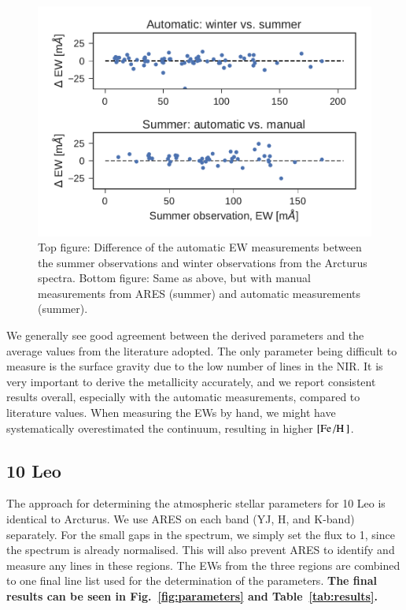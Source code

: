 \documentclass{aa}
\begin{document}
\begin{figure}[htpb!]
    \centering
    \includegraphics[width=1.0\linewidth]{figures/EWcomp.pdf}
    \caption{Top figure: Difference of the automatic EW measurements between the
             summer observations and winter observations from the Arcturus
             spectra. Bottom figure: Same as above, but with manual measurements
             from ARES (summer) and automatic measurements (summer).}
    \label{fig:EWcomp}
\end{figure}


We generally see good agreement between the derived parameters and the average
values from the literature adopted. The only parameter being difficult to
measure is the surface gravity due to the low number of  lines in
the NIR. It is very important to derive the metallicity accurately, and we
report consistent results overall, especially with the automatic measurements,
compared to literature values. When measuring the EWs by hand, we might have
systematically overestimated the continuum, resulting in higher
$[\ion{Fe}/\ion{H}]$.


\subsection{10 Leo}
\label{sec:10Leo}

The approach for determining the atmospheric stellar parameters for 10 Leo is
identical to Arcturus. We use ARES on each band (YJ, H, and K-band) separately.
For the small gaps in the spectrum, we simply set the flux to 1, since the
spectrum is already normalised. This will also prevent ARES to identify and
measure any lines in these regions. The EWs from the three regions are combined
to one final line list used for the determination of the parameters. {\bf The
final results can be seen in Fig.~\ref{fig:parameters} and
Table~\ref{tab:results}.}
\end{document}
